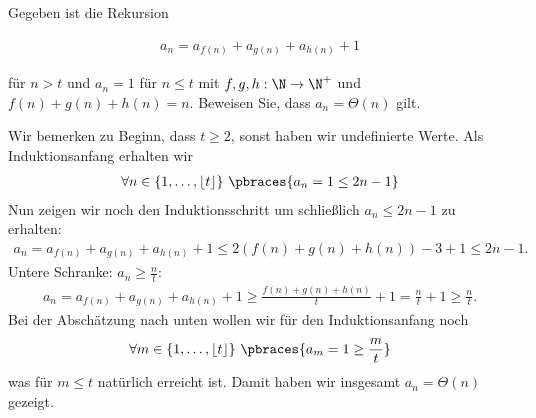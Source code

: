 
\begin{exercise}

Gegeben ist die Rekursion

\begin{align*}
  a_n = a_{f(n)} + a_{g(n)} + a_{h(n)} + 1
\end{align*}

für $n > t$ und $a_n = 1$ für $n \leq t$ mit $f,g,h: \N \rightarrow \N^+$ und $f(n) + g(n) + h(n) = n$. Beweisen Sie, dass $a_n = \Theta(n)$ gilt.
\end{exercise}


\begin{solution}
Wir bemerken zu Beginn, dass $t \geq 2$, sonst haben wir undefinierte Werte. Als Induktionsanfang erhalten wir
\begin{align*}
\forall n \in \{1, \dots, \lfloor t \rfloor\} \ \pbraces{a_n = 1 \leq 2n - 1}
\end{align*}
Nun zeigen wir noch den Induktionsschritt um schließlich $a_n \leq 2n - 1$ zu erhalten:
\begin{align*}
  a_n = a_{f(n)} + a_{g(n)} + a_{h(n)} + 1 \leq 2(f(n) + g(n) + h(n)) - 3 + 1 \leq 2n - 1.
\end{align*}
Untere Schranke: $a_n \geq \frac{n}{t}$:
\begin{align*}
  a_n = a_{f(n)} + a_{g(n)} + a_{h(n)} + 1 \geq \frac{f(n) + g(n) + h(n)}{t} + 1 = \frac{n}{t} + 1 \geq \frac{n}{t}.
\end{align*}
Bei der Abschätzung nach unten wollen wir für den Induktionsanfang noch
\begin{align*}
\forall m \in \{1, \dots, \lfloor t \rfloor \} \ \pbraces{a_m = 1 \geq \frac{m}{t}}
\end{align*}
was für $m \leq t$ natürlich erreicht ist. Damit haben wir insgesamt $a_n = \Theta(n)$ gezeigt.
\end{solution}

